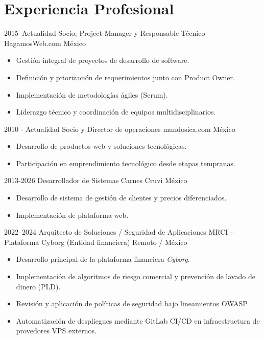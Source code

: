 \section{Experiencia Profesional}

\cventry
{2015--Actualidad}
{Socio, Project Manager y Responsable Técnico}
{HagamosWeb.com}
{México}
{}
{
\begin{itemize}
  \item Gestión integral de proyectos de desarrollo de software.
  \item Definición y priorización de requerimientos junto con Product Owner.
  \item Implementación de metodologías ágiles (Scrum).
  \item Liderazgo técnico y coordinación de equipos multidisciplinarios.
\end{itemize}
}

\cventry
{2010 - Actualidad}
{Socio y Director de operaciones}
{mundosica.com}
{México}
{}
{
\begin{itemize}
  \item Desarrollo de productos web y soluciones tecnológicas.
  \item Participación en emprendimiento tecnológico desde etapas tempranas.
\end{itemize}
}

\cventry
{2013-2026}
{Desarrollador de Sistemas}
{Carnes Cruvi}
{México}
{}
{
\begin{itemize}
  \item Desarrollo de sistema de gestión de clientes y precios diferenciados.
  \item Implementación de plataforma web.
\end{itemize}
}

\cventry
{2022--2024}
{Arquitecto de Soluciones / Seguridad de Aplicaciones}
{MRCI -- Plataforma Cyborg (Entidad financiera)}
{Remoto / México}
{}
{
\begin{itemize}
  \item Desarrollo principal de la plataforma financiera \textit{Cyborg}.
  \item Implementación de algoritmos de riesgo comercial y prevención de lavado de dinero (PLD).
  \item Revisión y aplicación de políticas de seguridad bajo lineamientos OWASP.
  \item Automatización de despliegues mediante GitLab CI/CD en infraestructura de provedores VPS externos.
\end{itemize}
}


